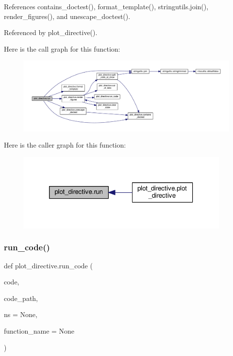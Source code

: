 References contains\+\_\+doctest(), format\+\_\+template(), stringutils.\+join(), render\+\_\+figures(), and unescape\+\_\+doctest().



Referenced by plot\+\_\+directive().

Here is the call graph for this function\+:
\nopagebreak
\begin{figure}[H]
\begin{center}
\leavevmode
\includegraphics[width=350pt]{namespaceplot__directive_a978468d13700c2d59e021ffcd98820b5_cgraph}
\end{center}
\end{figure}
Here is the caller graph for this function\+:
\nopagebreak
\begin{figure}[H]
\begin{center}
\leavevmode
\includegraphics[width=302pt]{namespaceplot__directive_a978468d13700c2d59e021ffcd98820b5_icgraph}
\end{center}
\end{figure}
\mbox{\label{namespaceplot__directive_a469169f4fbfd6b8948d1a02bcd9eb85c}} 
\subsubsection{\texorpdfstring{run\+\_\+code()}{run\_code()}}
{\footnotesize\ttfamily def plot\+\_\+directive.\+run\+\_\+code (\begin{DoxyParamCaption}\item[{}]{code,  }\item[{}]{code\+\_\+path,  }\item[{}]{ns = {\ttfamily None},  }\item[{}]{function\+\_\+name = {\ttfamily None} }\end{DoxyParamCaption})}

